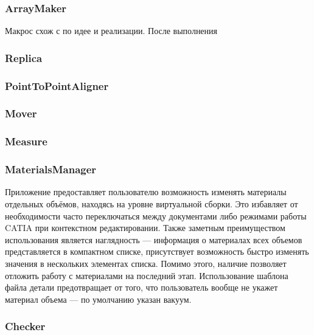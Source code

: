 \subsubsection{ArrayMaker}\label{sec:ArrayMaker}



Макрос  схож с  по идее и реализации. После выполнения 

\subsubsection{Replica}\label{sec:Replica}

\subsubsection{PointToPointAligner}\label{sec:PointToPointAligner}

\subsubsection{Mover}\label{sec:Mover}

\subsubsection{Measure}\label{sec:Measure}

\subsubsection{MaterialsManager}\label{sec:MaterialsManager}

Приложение  предоставляет пользователю возможность изменять материалы отдельных объёмов, находясь на уровне виртуальной сборки. Это избавляет от необходимости часто переключаться между документами либо режимами работы CATIA при контекстном редактировании. Также заметным преимуществом использования  является наглядность --- информация о материалах всех объемов представляется в компактном списке, присутствует возможность быстро изменять значения в нескольких элементах списка. Помимо этого, наличие  позволяет отложить работу с материалами на последний этап. Использование шаблона файла детали предотвращает от того, что пользователь вообще не укажет материал объема --- по умолчанию указан вакуум.

\subsubsection{Checker}\label{sec:Checker}

